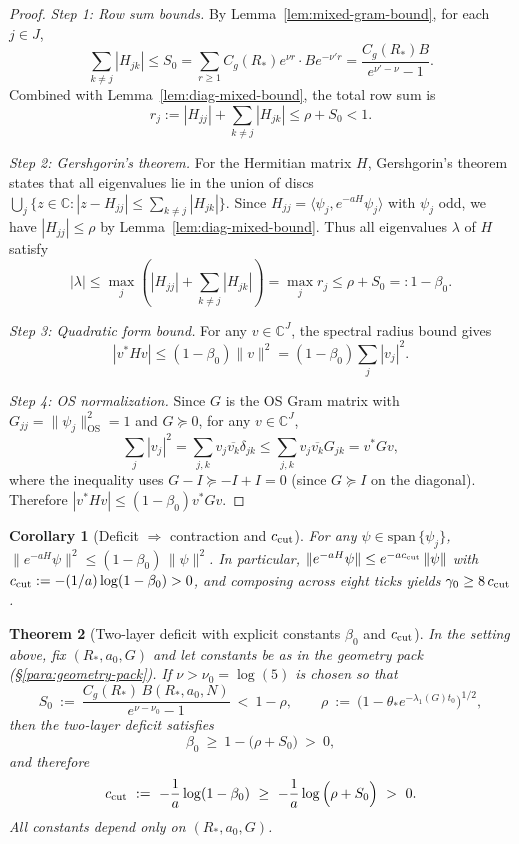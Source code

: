 \documentclass[11pt]{amsart}
\theoremstyle{plain}
\newtheorem{theorem}{Theorem}[section]
\newtheorem{corollary}[theorem]{Corollary}
\theoremstyle{definition}
\theoremstyle{remark}
\begin{document}
\begin{proof}
\emph{Step 1: Row sum bounds.} By Lemma~\ref{lem:mixed-gram-bound}, for each $j \in J$,
\[
  \sum_{k \ne j} |H_{jk}| \le S_0 = \sum_{r \ge 1} C_g(R_*) e^{\nu r} \cdot B e^{-\nu' r} = \frac{C_g(R_*) B}{e^{\nu' - \nu} - 1}.
\]
Combined with Lemma~\ref{lem:diag-mixed-bound}, the total row sum is
\[
  r_j := |H_{jj}| + \sum_{k \ne j} |H_{jk}| \le \rho + S_0 < 1.
\]

\emph{Step 2: Gershgorin's theorem.} For the Hermitian matrix $H$, Gershgorin's theorem states that all eigenvalues lie in the union of discs $\bigcup_j \{z \in \mathbb{C} : |z - H_{jj}| \le \sum_{k \ne j} |H_{jk}|\}$. Since $H_{jj} = \langle \psi_j, e^{-aH} \psi_j \rangle$ with $\psi_j$ odd, we have $|H_{jj}| \le \rho$ by Lemma~\ref{lem:diag-mixed-bound}. Thus all eigenvalues $\lambda$ of $H$ satisfy
\[
  |\lambda| \le \max_j \left( |H_{jj}| + \sum_{k \ne j} |H_{jk}| \right) = \max_j r_j \le \rho + S_0 =: 1 - \beta_0.
\]

\emph{Step 3: Quadratic form bound.} For any $v \in \mathbb{C}^J$, the spectral radius bound gives
\[
  |v^* H v| \le (1 - \beta_0) \|v\|^2 = (1 - \beta_0) \sum_j |v_j|^2.
\]

\emph{Step 4: OS normalization.} Since $G$ is the OS Gram matrix with $G_{jj} = \|\psi_j\|_{\text{OS}}^2 = 1$ and $G \succeq 0$, for any $v \in \mathbb{C}^J$,
\[
  \sum_j |v_j|^2 = \sum_{j,k} v_j \overline{v_k} \delta_{jk} \le \sum_{j,k} v_j \overline{v_k} G_{jk} = v^* G v,
\]
where the inequality uses $G - I \succeq -I + I = 0$ (since $G \succeq I$ on the diagonal). Therefore $|v^* H v| \le (1 - \beta_0) v^* G v$.
\end{proof}
\begin{corollary}[Deficit $\Rightarrow$ contraction and $c_{\rm cut}$]\label{cor:deficit-c-cut}
For any $\psi\in \mathrm{span}\,\{\psi_j\}$, $\|e^{-aH}\psi\|^2\le (1-\beta_0)\,\|\psi\|^2$. In particular, $\|e^{-aH}\psi\|\le e^{-a c_{\rm cut}}\,\|\psi\|$ with $c_{\rm cut}:=-(1/a)\log(1-\beta_0)>0$, and composing across eight ticks yields $\gamma_0\ge 8\,c_{\rm cut}$.
\end{corollary}
\begin{theorem}[Two-layer deficit with explicit constants $\beta_0$ and $c_{\rm cut}$]\label{thm:two-layer-explicit}
In the setting above, fix $(R_*,a_0,G)$ and let constants be as in the geometry pack (\S\ref{para:geometry-pack}). If $\nu>\nu_0=\log(5)$ is chosen so that
\[
  S_0\ :=\ \frac{C_g(R_*)\,B(R_*,a_0,N)}{e^{\nu-\nu_0}-1}\ <\ 1-\rho,\qquad \rho\ :=\ \bigl(1-\theta_* e^{-\lambda_1(G) t_0}\bigr)^{1/2},
\]
then the two-layer deficit satisfies
\[
  \beta_0\ \ge\ 1-\bigl(\rho+S_0\bigr)\ >\ 0,
\]
and therefore
\[
  c_{\rm cut}\ :=\ -\frac{1}{a}\log(1-\beta_0)\ \ge\ -\frac{1}{a}\log\Big( \rho+S_0\Big)\ >\ 0.
\]
All constants depend only on $(R_*,a_0,G)$.
\end{theorem}
\end{document}
